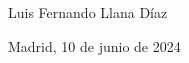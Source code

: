 \documentclass[11pt, a4paper]{article} %
\begin{document}
\begin{titlepage}
    \vfill
    
    
    \begin{minipage}{0.75\textwidth}
        \begin{flushleft}
            {\Large Luis Fernando Llana Díaz}
        \end{flushleft}
    \end{minipage}

    \vfill
    \vfill
    \vfill 

	\begin{minipage}{0.75\textwidth}
    	    \begin{flushright}
    	    		{\Large Madrid, 10 de junio de 2024}  
		\end{flushright}        	           
	\end{minipage}     
     
    
\end{titlepage}
\end{document}
